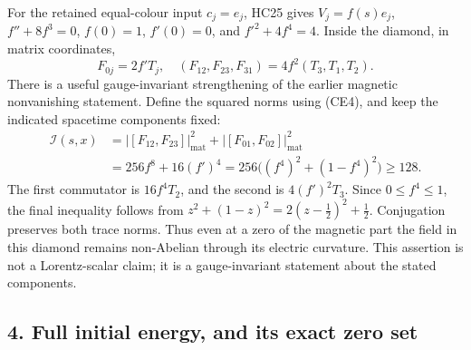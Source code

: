 \documentclass[11pt]{article}
\begin{document}
For the retained equal-colour input \(c_j=e_j\), HC25 gives
\(V_j=f(s)e_j\), \(f''+8f^3=0\), \(f(0)=1\), \(f'(0)=0\), and
\(f'^2+4f^4=4\). Inside the diamond, in matrix coordinates,
\[
 F_{0j}=2f'T_j,\quad
 (F_{12},F_{23},F_{31})=4f^2(T_3,T_1,T_2).
 \tag{CE16}
\]
There is a useful gauge-invariant strengthening of the earlier magnetic
nonvanishing statement. Define the squared norms using (CE4), and keep
the indicated spacetime components fixed:
\[
 \begin{aligned}
 \mathcal I(s,x)
 &=|[F_{12},F_{23}]|_{\mathrm{mat}}^2
     +|[F_{01},F_{02}]|_{\mathrm{mat}}^2\\
 &=256f^8+16(f')^4
   =256\bigl((f^4)^2+(1-f^4)^2\bigr)\geq128.
 \end{aligned}\tag{CE17}
\]
The first commutator is \(16f^4T_2\), and the second is
\(4(f')^2T_3\). Since \(0\leq f^4\leq1\), the final inequality follows
from \(z^2+(1-z)^2=2(z-\tfrac12)^2+\tfrac12\).
Conjugation preserves both trace norms. Thus even at a zero of the
magnetic part the field in this diamond remains non-Abelian through
its electric curvature. This assertion is not a Lorentz-scalar claim;
it is a gauge-invariant statement about the stated components.

\subsection*{4. Full initial energy, and its exact zero set}
\end{document}
